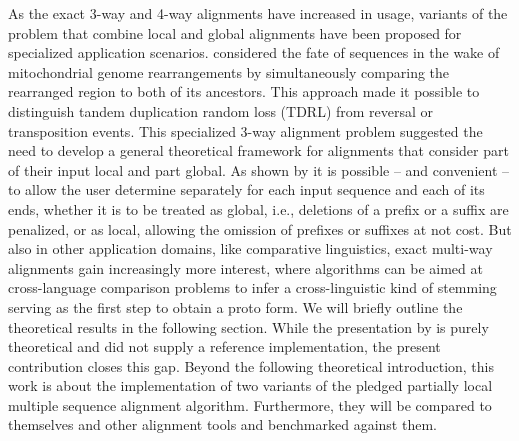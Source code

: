 \documentclass[a4paper,10pt]{thesis}
\begin{document}
{{  \gapSmall
  As the exact 3-way and 4-way alignments have increased in usage, variants of the problem that combine local and global alignments have been proposed for specialized application scenarios.  considered the fate of sequences in the wake of mitochondrial genome rearrangements by simultaneously comparing the rearranged region to both of its ancestors. This approach made it possible to distinguish tandem duplication random loss (TDRL) from reversal or transposition events. This specialized 3-way alignment problem suggested the need to develop a general theoretical framework for alignments that consider part of their input local and part global. As shown by \citep{Retzlaff:18a} it is possible -- and convenient -- to allow the user determine separately for each input sequence and each of its ends, whether it is to be treated as global, i.e., deletions of a prefix or a suffix are penalized, or as local, allowing the omission of prefixes or suffixes at not cost. But also in other application domains, like comparative linguistics, exact multi-way alignments gain increasingly more interest, where algorithms can be aimed at cross-language comparison problems to infer a cross-linguistic kind of stemming serving as the first step to obtain a proto form. We will briefly outline the theoretical results in the following section. While the presentation by \citet{Retzlaff:18a} is purely theoretical and did not supply a reference implementation, the present contribution closes this gap.
  \gapBig
  Beyond the following theoretical introduction, this work is about the implementation of two variants of the pledged partially local multiple sequence alignment algorithm. Furthermore, they will be compared to themselves and other alignment tools and benchmarked against them.
  }
  \newpage
  }
\end{document}
